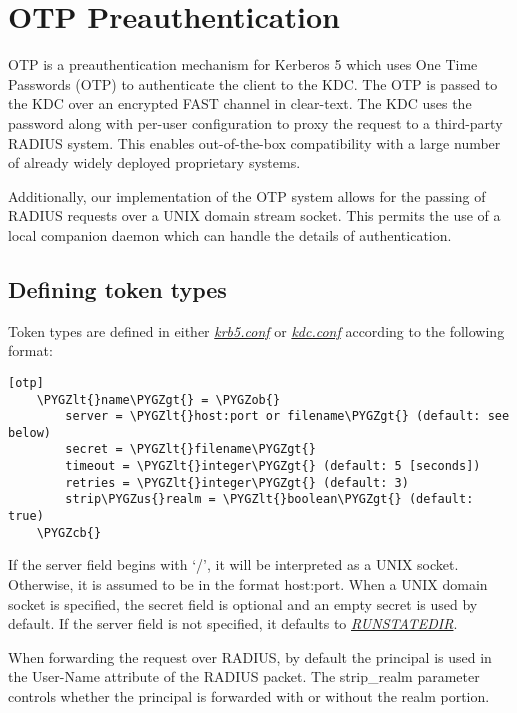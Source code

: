 \documentclass[letterpaper,10pt,english]{sphinxmanual}
\def\PYGZus{\char`\_}
\def\PYGZob{\char`\{}
\def\PYGZcb{\char`\}}
\def\PYGZlt{\char`\<}
\def\PYGZgt{\char`\>}
\begin{document}
\chapter{OTP Preauthentication}
\label{admin/otp::doc}\label{admin/otp:otp-preauthentication}\label{admin/otp:otp-preauth}
OTP is a preauthentication mechanism for Kerberos 5 which uses One
Time Passwords (OTP) to authenticate the client to the KDC.  The OTP
is passed to the KDC over an encrypted FAST channel in clear-text.
The KDC uses the password along with per-user configuration to proxy
the request to a third-party RADIUS system.  This enables
out-of-the-box compatibility with a large number of already widely
deployed proprietary systems.

Additionally, our implementation of the OTP system allows for the
passing of RADIUS requests over a UNIX domain stream socket.  This
permits the use of a local companion daemon which can handle the
details of authentication.


\section{Defining token types}
\label{admin/otp:defining-token-types}
Token types are defined in either {\hyperref[admin/conf_files/krb5_conf:krb5-conf-5]{\emph{krb5.conf}}} or
{\hyperref[admin/conf_files/kdc_conf:kdc-conf-5]{\emph{kdc.conf}}} according to the following format:

\begin{Verbatim}[commandchars=\\\{\}]
[otp]
    \PYGZlt{}name\PYGZgt{} = \PYGZob{}
        server = \PYGZlt{}host:port or filename\PYGZgt{} (default: see below)
        secret = \PYGZlt{}filename\PYGZgt{}
        timeout = \PYGZlt{}integer\PYGZgt{} (default: 5 [seconds])
        retries = \PYGZlt{}integer\PYGZgt{} (default: 3)
        strip\PYGZus{}realm = \PYGZlt{}boolean\PYGZgt{} (default: true)
    \PYGZcb{}
\end{Verbatim}

If the server field begins with `/', it will be interpreted as a UNIX
socket.  Otherwise, it is assumed to be in the format host:port.  When
a UNIX domain socket is specified, the secret field is optional and an
empty secret is used by default.  If the server field is not
specified, it defaults to {\hyperref[mitK5defaults:paths]{\emph{RUNSTATEDIR}}}.

When forwarding the request over RADIUS, by default the principal is
used in the User-Name attribute of the RADIUS packet.  The strip\_realm
parameter controls whether the principal is forwarded with or without
the realm portion.
\end{document}
